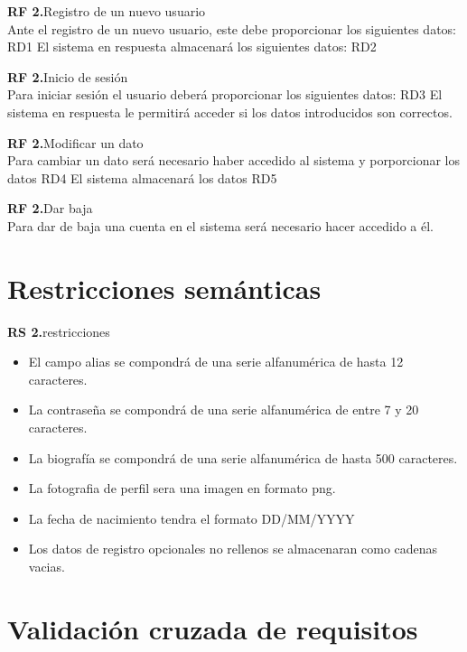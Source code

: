 \documentclass[
  12pt,
  a4paper,
  DIV=12,
  spanish,
]{scrartcl}
\newcounter{RFdCounter} %
\newcommand{\rfd}[1]{\addtocounter{RFdCounter}{1}\textbf{\rmfamily RF 2.\theRFdCounter}\quad#1\\}
\newcounter{RSdCounter} %
\newcommand{\rsd}[1]{\addtocounter{RSdCounter}{1}\textbf{\rmfamily RS 2.\theRSdCounter}\quad#1\\}
\begin{document}
\rfd{Registro de un nuevo usuario}
Ante el registro de un nuevo usuario, este debe proporcionar los siguientes datos:
RD1
El sistema en respuesta almacenará los siguientes datos:
RD2
\rfd{Inicio de sesión}
Para iniciar sesión el usuario deberá proporcionar los siguientes datos:
RD3
El sistema en respuesta le permitirá acceder si los datos introducidos son correctos.
\rfd{Modificar un dato}
Para cambiar un dato será necesario haber accedido al sistema y porporcionar los datos
RD4
El sistema almacenará los datos
RD5
\rfd{Dar baja}
Para dar de baja una cuenta en el sistema será necesario hacer accedido a él.


\section{Restricciones semánticas}

\rsd{restricciones}
\begin{itemize}
\item El campo alias se compondrá de una serie alfanumérica de hasta 12 caracteres.
\item La contraseña se compondrá de una serie alfanumérica de entre 7 y 20 caracteres.
\item La biografía se compondrá de una serie alfanumérica de hasta 500 caracteres.
\item La fotografia de perfil sera una imagen en formato png.
\item La fecha de nacimiento tendra el formato DD/MM/YYYY
\item Los datos de registro opcionales no rellenos se almacenaran como cadenas vacias.
\end{itemize}

\section{Validación cruzada de requisitos}
\end{document}
